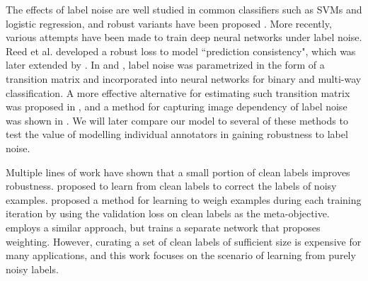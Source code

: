 The effects of label noise are well studied in common classifiers such as SVMs and logistic regression, and robust variants have been proposed \cite{frenay2014classification,natarajan2013learning,bootkrajang2012label}.  More recently, various attempts have been made to train deep neural networks under label noise.  Reed et al. \cite{reed2014training} developed a robust loss to model ``prediction consistency", which was later extended by \cite{tanaka2018joint}. %
In \cite{mnih2012learning} and \cite{sukhbaatar2014training}, label noise was parametrized in the form of a transition matrix and incorporated into neural networks for binary and multi-way classification. A more effective alternative for estimating such transition matrix was proposed in \cite{patrini2017making}, and a method for capturing image dependency of label noise was shown in \cite{Goldberger2017TrainingDN}. We will later compare our model to several of these methods to test the value of modelling individual annotators in gaining robustness to label noise. 

Multiple lines of work have shown that a small portion of clean labels improves robustness. \cite{veit2017learning} proposed to learn from clean labels to correct the labels of noisy examples. \cite{ren2018learning} proposed a method for learning to weigh examples during each training iteration by using the validation loss on clean labels as the meta-objective. \cite{jiang2018mentornet} employs a similar approach, but trains a separate network that proposes weighting. However, curating a set of clean labels of sufficient size is expensive for many applications, and this work focuses on the scenario of learning from purely noisy labels. 



